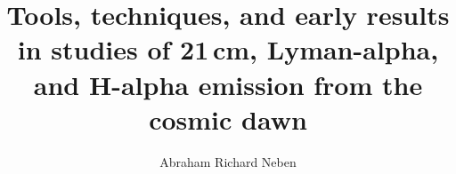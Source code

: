 % 
% 
%
%
%
%
%
%
%
% 
% 

\title{Tools, techniques, and early results in studies of 21\,cm, Lyman-alpha, and H-alpha emission from the cosmic dawn}

\author{Abraham Richard Neben}


